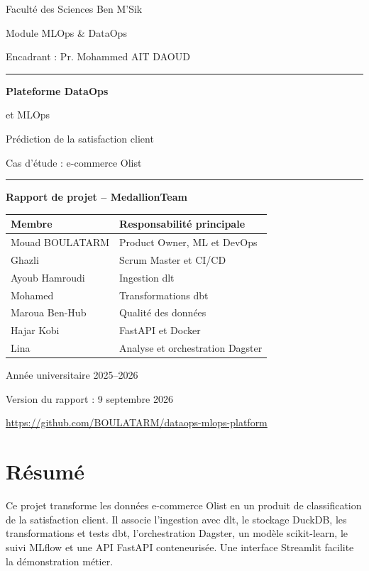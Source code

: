 \documentclass[11pt,a4paper]{report}
\begin{document}
\begin{titlepage}
\centering
{\Large\sffamily Faculté des Sciences Ben M'Sik\par}
\vspace{0.4cm}
{\large Module MLOps \& DataOps\par}
{\large Encadrant : Pr. Mohammed AIT DAOUD\par}
\vspace{1.6cm}
{\color{teal}\rule{\linewidth}{2pt}}\par
\vspace{0.5cm}
{\Huge\sffamily\bfseries\color{navy} Plateforme DataOps\par et MLOps\par}
\vspace{0.5cm}
{\LARGE Prédiction de la satisfaction client\par}
{\Large Cas d'étude : e-commerce Olist\par}
\vspace{0.5cm}
{\color{teal}\rule{\linewidth}{2pt}}\par
\vspace{1cm}
{\large\bfseries Rapport de projet -- MedallionTeam\par}
\vspace{0.5cm}
\par\noindent\begin{tabularx}{\linewidth}{Y Y}\toprule
\textbf{Membre} & \textbf{Responsabilité principale}\\\midrule
Mouad BOULATARM & Product Owner, ML et DevOps\\
Ghazli & Scrum Master et CI/CD\\
Ayoub Hamroudi & Ingestion dlt\\
Mohamed & Transformations dbt\\
Maroua Ben-Hub & Qualité des données\\
Hajar Kobi & FastAPI et Docker\\
Lina & Analyse et orchestration Dagster\\\bottomrule
\end{tabularx}
\vfill
Année universitaire 2025--2026\par
Version du rapport : 9 septembre 2026\par
\small\url{https://github.com/BOULATARM/dataops-mlops-platform}
\end{titlepage}
\chapter*{Résumé}
Ce projet transforme les données e-commerce Olist en un produit de classification de la satisfaction client. Il associe l'ingestion avec dlt, le stockage DuckDB, les transformations et tests dbt, l'orchestration Dagster, un modèle scikit-learn, le suivi MLflow et une API FastAPI conteneurisée. Une interface Streamlit facilite la démonstration métier.
\end{document}
